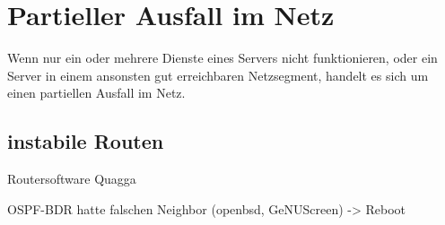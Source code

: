 \chapter{Partieller Ausfall im Netz}
\label{cha:netz-teilausfall}

\begin{abstractsec}
  Wenn nur ein oder mehrere Dienste eines Servers nicht funktionieren, oder
  ein Server in einem ansonsten gut erreichbaren Netzsegment, handelt es sich
  um einen partiellen Ausfall im Netz.
\end{abstractsec}

\section{instabile Routen}
\label{sec:instabile-routen}

\begin{notes}
\item Routersoftware Quagga
\item OSPF-BDR hatte falschen Neighbor (openbsd, GeNUScreen) -> Reboot
\end{notes}






